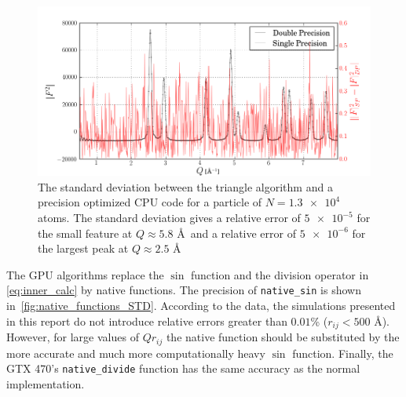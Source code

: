 \documentclass[11pt,twoside]{report}
\begin{document}
\begin{figure}[htbp]
	\begin{center}
		\includegraphics[width=1\textwidth]{img/13700_single_double.png}	
	\end{center}
	\caption{The standard deviation between the triangle algorithm and a precision optimized CPU code for a particle of $N = \num{1.3e4}$ atoms. The standard deviation gives a relative error of $\num{5e-5}$ for the small feature at $Q \approx 5.8$ \AA~and a relative error of  $\num{5e-6}$ for the largest peak at $Q \approx 2.5$ \AA\label{fig:single_double}}
\end{figure}

The GPU algorithms replace the $\sin$ function and the division operator in \cref{eq:inner_calc} by native functions. The precision of {\tt native\_sin} is shown in~\cref{fig:native_functions_STD}. According to the data, the simulations presented in this report do not introduce relative errors greater than $0.01$\% ($r_{ij} < 500$ \AA). However, for large values of $Qr_{ij}$ the native function should be substituted by the more accurate and much more computationally heavy $\sin$ function. Finally, the GTX 470's {\tt native\_divide} function has the same accuracy as the normal implementation. 
\end{document}
